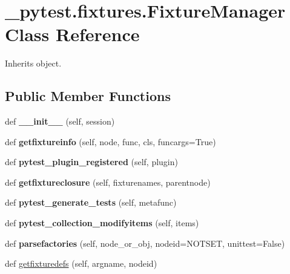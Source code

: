 \hypertarget{class__pytest_1_1fixtures_1_1_fixture_manager}{}\section{\+\_\+pytest.\+fixtures.\+Fixture\+Manager Class Reference}
\label{class__pytest_1_1fixtures_1_1_fixture_manager}


Inherits object.

\subsection*{Public Member Functions}
\begin{DoxyCompactItemize}
\item 
\mbox{\label{class__pytest_1_1fixtures_1_1_fixture_manager_a24db0c6c1cb28e6e75f510843accd4e2}} 
def {\bfseries \+\_\+\+\_\+init\+\_\+\+\_\+} (self, session)
\item 
\mbox{\label{class__pytest_1_1fixtures_1_1_fixture_manager_a52bbd48459828c7ba98e53601e5ae03d}} 
def {\bfseries getfixtureinfo} (self, node, func, cls, funcargs=True)
\item 
\mbox{\label{class__pytest_1_1fixtures_1_1_fixture_manager_a053e6ffcdd672085c62e6fcbb0a03f06}} 
def {\bfseries pytest\+\_\+plugin\+\_\+registered} (self, plugin)
\item 
\mbox{\label{class__pytest_1_1fixtures_1_1_fixture_manager_ab8ee0904e9f0e442e933deb94322d233}} 
def {\bfseries getfixtureclosure} (self, fixturenames, parentnode)
\item 
\mbox{\label{class__pytest_1_1fixtures_1_1_fixture_manager_ae7a03db3af43b86b13630283ebb556fe}} 
def {\bfseries pytest\+\_\+generate\+\_\+tests} (self, metafunc)
\item 
\mbox{\label{class__pytest_1_1fixtures_1_1_fixture_manager_a2a9f3475c7c5a0f6bb8c200b3205c123}} 
def {\bfseries pytest\+\_\+collection\+\_\+modifyitems} (self, items)
\item 
\mbox{\label{class__pytest_1_1fixtures_1_1_fixture_manager_a92b7f8f90c78c935f50d6cff851cdd81}} 
def {\bfseries parsefactories} (self, node\+\_\+or\+\_\+obj, nodeid=N\+O\+T\+S\+ET, unittest=False)
\item 
def \hyperlink{class__pytest_1_1fixtures_1_1_fixture_manager_a723def2e14db66ba209fe4071bfddeed}{getfixturedefs} (self, argname, nodeid)
\end{DoxyCompactItemize}
